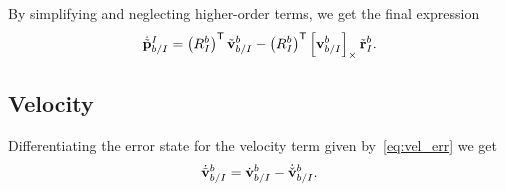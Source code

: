 By simplifying and neglecting higher-order terms, we get the final expression
\begin{equation}
  \dot{\tilde{\boldsymbol{\mathrm{p}}}}_{b/I}^{I} = \left(R_{I}^{b}\right)^{\mathsf{T}}
  \tilde{\boldsymbol{\mathrm{v}}}_{b/I}^{b} - \left(R_{I}^{b}\right)^{\mathsf{T}}
    \left[ \boldsymbol{\mathrm{v}}_{b/I}^{b} \right]_{\times} \tilde{\boldsymbol{\mathrm{r}}}_I^b.
\end{equation}

\subsection{Velocity}

Differentiating the error state for the velocity term given
by~\eqref{eq:vel_err} we get
\begin{equation}
  \dot{\tilde{\boldsymbol{\mathrm{v}}}}_{b/I}^{b} = \dot{\boldsymbol{\mathrm{v}}}_{b/I}^{b} -
    \dot{\check{\boldsymbol{\mathrm{v}}}}_{b/I}^{b}.
\end{equation}

